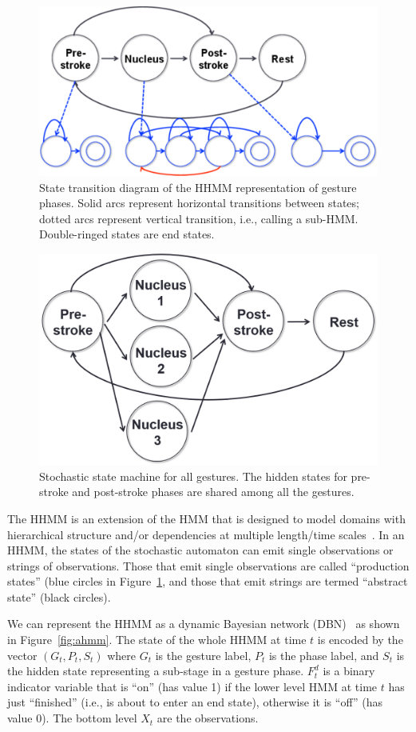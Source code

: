 \begin{figure}[tbh]
\centering
\includegraphics[clip, width=0.7\columnwidth]{figures/hhmm.pdf}
\caption{State transition diagram of the HHMM representation of gesture phases.
Solid arcs represent horizontal transitions between states; dotted arcs
represent vertical transition, i.e., calling a sub-HMM. Double-ringed states
are end states.}
\label{fig:hhmm}
\end{figure}

\begin{figure}[tbh]
\centering
\includegraphics[width=0.7\columnwidth]{figures/combined.png}
\caption{Stochastic state machine for all gestures. The
hidden states for pre-stroke and post-stroke phases are shared among all the
gestures.
}
\label{fig:combined}
\end{figure}

The HHMM is an extension of the HMM that is designed to model domains with
hierarchical structure and/or dependencies at multiple length/time
scales~\cite{murphy02}. In an HHMM, the states of the stochastic automaton can
emit single observations or strings of observations. Those that emit single
observations are called ``production states'' (blue circles in
Figure~\ref{fig:hhmm}, and those that emit strings are termed ``abstract
state'' (black circles). 

We can represent the HHMM as a dynamic Bayesian network (DBN)~\cite{murphy02} as
shown in Figure~\ref{fig:ahmm}.
The state of the whole HHMM at time $t$ is encoded by the vector $(G_t, P_t, S_t)$ where $G_t$ is the gesture label, $P_t$ is the
phase label, and $S_t$ is the hidden state representing a sub-stage in a
gesture phase. $F_t^d$ is a binary indicator variable that is
``on'' (has value 1) if the lower level HMM at time $t$ has just ``finished''
(i.e., is about to enter an end state), otherwise it is ``off'' (has value 0).
The bottom level $X_t$ are the observations. 

